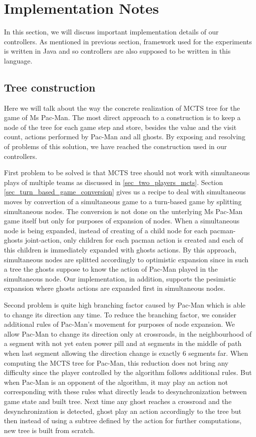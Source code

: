 \section{Implementation Notes}

In this section, we will discuss important implementation details of our controllers. As
mentioned in previous section, framework used for the experiments is written in Java and so
controllers are also supposed to be written in this language.


\subsection{Tree construction}

Here we will talk about the way the concrete realization of MCTS tree for the game of Ms
Pac-Man. The most direct approach to a construction is to keep a node of the tree for each game
step and store, besides the value and the visit count, actions performed by Pac-Man and all
ghosts. By exposing and resolving of problems of this solution, we have reached the
construction used in our controllers.

First problem to be solved is that MCTS tree should not work with simultaneous plays of
multiple teams as discussed in \ref{sec_two_players_mcts}. Section 
\ref{sec_turn_based_game_conversion} gives us a recipe to deal with simultaneous moves by
convertion of a simultaneous game to a turn-based game by splitting simultaneous nodes. The
conversion is not done on the unterlying Ms Pac-Man game itself but only for purposes of
expansion of nodes. When a simultaneous node is being expanded, instead of creating of a child
node for each pacman-ghosts joint-action, only children for each pacman action is created and
each of this children is immediately expanded with ghosts actions. By this approach,
simultaneous nodes are splitted accordingly to optimistic expansion since in such a tree the
ghosts suppose to know the action of Pac-Man played in the simultaneous node. Our
implementation, in addition, supports the pesimistic expansion where ghosts actions are
expanded first in simultaneous nodes.

Second problem is quite high branching factor caused by Pac-Man which is able to change its
direction any time. To reduce the branching factor, we consider additional rules of Pac-Man's
movement for purposes of node expansion. We allow Pac-Man to change its direction only at
crossroads, in the neighbourhood of a segment with not yet eaten power pill and at segments in
the middle of path when last segment allowing the direction change is exactly 6 segments far.
When computing the MCTS tree for Pac-Man, this reduction does not bring any difficulty since
the player controlled by the algorithm follows additional rules. But when Pac-Man is an
opponent of the algorithm, it may play an action not corresponding with these rules what
directly leads to desynchronization between game state and built tree. Next time any ghost
reaches  a crossroad and the desynchronization is detected, ghost play an action accordingly to
the tree but then instead of using a subtree defined by the action for further computations,
new tree is built from scratch.

